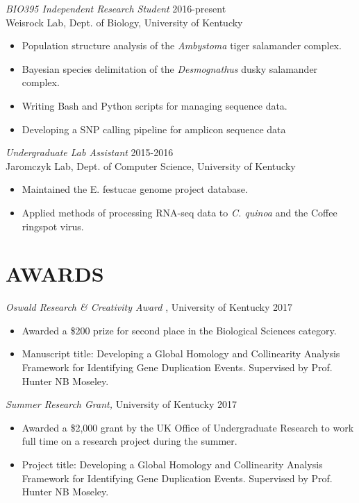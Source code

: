 \documentclass[margin, 10pt]{res} %
\begin{document}
\begin{resume}
{\sl BIO395 Independent Research Student} \hfill 2016-present \\
Weisrock Lab, Dept. of Biology, University of Kentucky
\begin{itemize} \itemsep -2pt %
\item Population structure analysis of the {\sl Ambystoma} tiger salamander complex.
\item Bayesian species delimitation of the {\sl Desmognathus} dusky salamander complex.
\item Writing Bash and Python scripts for managing sequence data.
\item Developing a SNP calling pipeline for amplicon sequence data
\end{itemize}

{\sl Undergraduate Lab Assistant} \hfill 2015-2016 \\
Jaromczyk Lab, Dept. of Computer Science, University of Kentucky
\begin{itemize} \itemsep -2pt %
\item Maintained the E. festucae genome project database.
\item Applied methods of processing RNA-seq data to {\sl C. quinoa} and the Coffee ringspot virus.
\end{itemize}


\section{AWARDS}

{\sl Oswald Research \& Creativity Award} , University of Kentucky \hfill 2017
\begin{itemize} \itemsep -2pt %
\item Awarded a \$200 prize for second place in the Biological Sciences category.
\item Manuscript title: Developing a Global Homology and Collinearity Analysis Framework for Identifying Gene Duplication Events. Supervised by Prof. Hunter NB Moseley.
\end{itemize}

{\sl Summer Research Grant,}  University of Kentucky \hfill 2017
\begin{itemize} \itemsep -2pt %
\item Awarded a \$2,000 grant by the UK Office of Undergraduate Research to work full time on a research project during the summer.
\item Project title: Developing a Global Homology and Collinearity Analysis Framework for Identifying Gene Duplication Events. Supervised by Prof. Hunter NB Moseley.
\end{itemize}


\end{resume}
\end{document}
